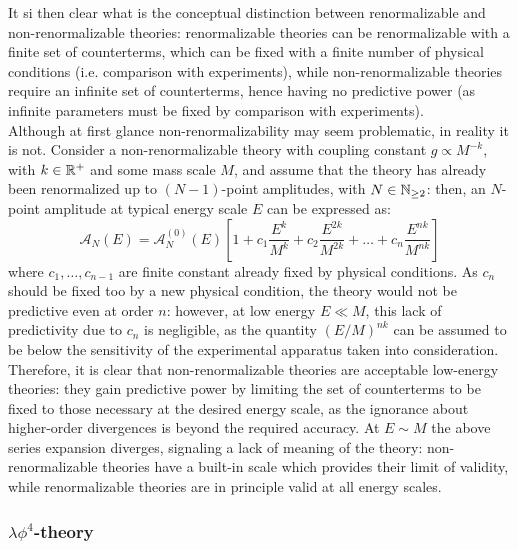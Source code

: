 It si then clear what is the conceptual distinction between renormalizable and non-renormalizable theories: renormalizable theories can be renormalizable with a finite set of counterterms, which can be fixed with a finite number of physical conditions (i.e. comparison with experiments), while non-renormalizable theories require an infinite set of counterterms, hence having no predictive power (as infinite parameters must be fixed by comparison with experiments). \\
Although at first glance non-renormalizability may seem problematic, in reality it is not. Consider a non-renormalizable theory with coupling constant $ g \propto M^{-k} $, with $ k \in \mathbb{R}^+ $ and some mass scale $ M $, and assume that the theory has already been renormalized up to $ (N - 1) $-point amplitudes, with $ N \in \mathbb{N}_{\ge 2} $: then, an $ N $-point amplitude at typical energy scale $ E $ can be expressed as:
\begin{equation*}
  \mathcal{A}_N(E) = \mathcal{A}^{(0)}_N(E) \left[ 1 + c_1 \frac{E^k}{M^k} + c_2 \frac{E^{2k}}{M^{2k}} + \dots + c_n \frac{E^{nk}}{M^{nk}} \right]
\end{equation*}
where $ c_1, \dots, c_{n-1} $ are finite constant already fixed by physical conditions. As $ c_n $ should be fixed too by a new physical condition, the theory would not be predictive even at order $ n $: however, at low energy $ E \ll M $, this lack of predictivity due to $ c_n $ is negligible, as the quantity $ (E/M)^{nk} $ can be assumed to be below the sensitivity of the experimental apparatus taken into consideration. Therefore, it is clear that non-renormalizable theories are acceptable low-energy theories: they gain predictive power by limiting the set of counterterms to be fixed to those necessary at the desired energy scale, as the ignorance about higher-order divergences is beyond the required accuracy. At $ E \sim M $ the above series expansion diverges, signaling a lack of meaning of the theory: non-renormalizable theories have a built-in scale which provides their limit of validity, while renormalizable theories are in principle valid at all energy scales.

\subsubsection{\texorpdfstring{$ \lambda \phi^4 $}{λφ4}-theory}

